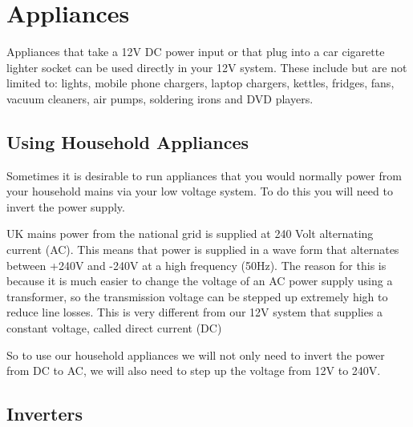\documentclass{article}
\theoremstyle{definition}
\theoremstyle{definition}
\theoremstyle{remark}
\begin{document}


{\color{blue}\section{Appliances}} %
\label{sec:appliances}

  Appliances that take a 12V DC power input or that plug into a car cigarette lighter socket can be used directly in your 12V system. These include but are not limited to: lights, mobile phone chargers, laptop chargers, kettles, fridges, fans, vacuum cleaners, air pumps, soldering irons and DVD players. 

  {\color{blue}\subsection{Using Household Appliances}} %
  \label{sub:using_household_appliances}

    Sometimes it is desirable to run appliances that you would normally power from your household mains via your low voltage system. To do this you will need to invert the power supply.

    UK mains power from the national grid is supplied at 240 Volt alternating current (AC). This means that power is supplied in a wave form that alternates between +240V and -240V at a high frequency (50Hz). The reason for this is because it is much easier to change the voltage of an AC power supply using a transformer, so the transmission voltage can be stepped up extremely high to reduce line losses. This is very different from our 12V system that supplies a constant voltage, called direct current (DC)

    So to use our household appliances we will not only need to invert the power from DC to AC, we will also need to step up the voltage from 12V to 240V.
  

  {\color{blue}\subsection{Inverters}} %
  \label{sub:inverters}
\end{document}

